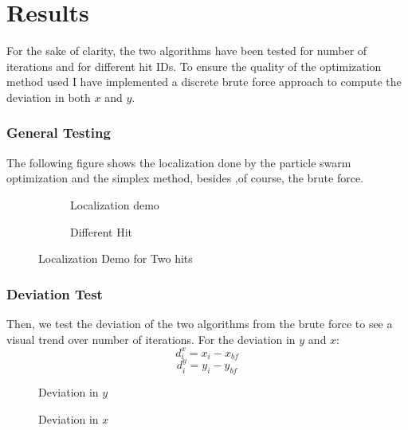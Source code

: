 

\large
\part{Results}
For the sake of clarity, the two algorithms have been tested for number
of iterations and for different hit IDs. To ensure the quality of the
optimization method used I have implemented a discrete brute force
approach to compute the deviation in both {\(x\)} and {\(y\)}.

\section{General Testing}
The following figure shows the localization done by the particle swarm
optimization and the simplex method, besides ,of course, the brute
force.

\begin{figure}[htp]
\begin{subfigure}{0.5\textwidth}
    \centering
   \scalebox{.35}{}
  \caption{Localization demo}
  \label{fig:sub1}
\end{subfigure}%
\begin{subfigure}{0.5\textwidth}
 \centering
   \scalebox{.35}{}
  \caption{Different Hit}
  \label{fig:sub2}
\end{subfigure}
\caption{Localization Demo for Two hits}
\label{fig:test}
\end{figure}

\section{Deviation Test}
Then, we test the deviation of the two algorithms from the brute force
to see a visual trend over number of iterations. 
For the deviation in {\(y\)} and {\(x\)}:
$$d_i^x = x_i - x_{bf}$$
$$d_i^y = y_i - y_{bf}$$

    \begin{figure}[htb]
        \centering
        \scalebox{0.38}{}
        \caption{Deviation in {\(y\)} }
        \label{fig:label}
    \end{figure}
    \begin{figure}[htb]
        \centering
        \scalebox{0.4}{}
        \caption{Deviation in {\(x\)} }
        \label{fig:label}
    \end{figure}

\pagebreak
